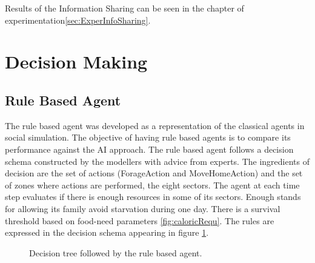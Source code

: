 \documentclass[11pt,oneside,a4paper,openright]{report}
\begin{document}
Results of the Information Sharing can be seen in the chapter of experimentation\ref{sec:ExperInfoSharing}.

\section{Decision Making}

\subsection{Rule Based Agent}

The rule based agent was developed as a representation of the classical agents in social simulation. The objective of having rule based agents is to compare its performance against the AI approach.
The rule based agent follows a decision schema constructed by the modellers with advice from experts.
The ingredients of decision are the set of actions (ForageAction and MoveHomeAction) and the set of zones where actions are performed, the eight sectors. The agent at each time step evaluates if there is enough resources in some of its sectors. Enough stands for allowing its family avoid starvation during one day. There is a survival threshold based on food-need parameters \ref{fig:caloricRequ}. The rules are expressed in the decision schema appearing in figure \ref{fig:decisionTree}.


	\begin{figure}[h!]
	\centering
	\setlength\fboxsep{0pt}
	\setlength\fboxrule{0.5pt}
	\caption{Decision tree followed by the rule based agent.}
	\label{fig:decisionTree}
	\end{figure}
\end{document}
